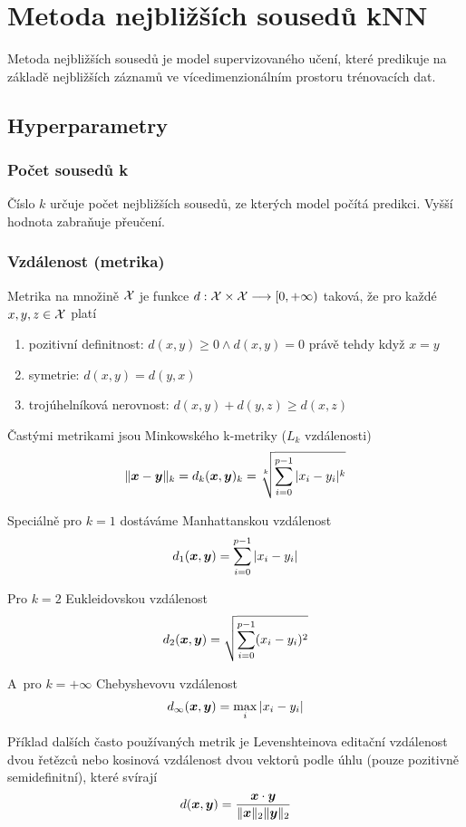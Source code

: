 \section{Metoda nejbližších sousedů kNN}

Metoda nejbližších sousedů je model supervizovaného učení, které predikuje na základě nejbližších záznamů ve vícedimenzionálním prostoru trénovacích dat.

\subsection{Hyperparametry}

\subsubsection{Počet sousedů k}

Číslo $k$ určuje počet nejbližších sousedů, ze kterých model počítá predikci. Vyšší hodnota zabraňuje přeučení.

\subsubsection{Vzdálenost (metrika)} \label{sec:metrika}

Metrika na množině $\mathcal{X}$ je funkce $d: \mathcal{X} \times \mathcal{X} \longrightarrow [0, +\infty)$ taková, že pro každé $x, y, z \in \mathcal{X}$ platí
\begin{enumerate}
    \item pozitivní definitnost: $d(x, y) \ge 0 \land d(x, y) = 0$ právě tehdy když $x = y$
    \item symetrie: $d(x,y) = d(y,x)$
    \item trojúhelníková nerovnost: $d(x, y) + d(y, z) \ge d(x, z)$
\end{enumerate}

Častými metrikami jsou Minkowského k-metriky ($L_k$ vzdálenosti)
\[
    \|\bm{x} - \bm{y}\|_k = d_k(\bm{x}, \bm{y})_k = \sqrt[k]{\sum_{i=0}^{p-1} |x_i - y_i|^k}
\]

Speciálně pro $k=1$ dostáváme Manhattanskou vzdálenost
\[
    d_1(\bm{x}, \bm{y}) = \sum_{i=0}^{p-1} |x_i - y_i|
\]

Pro $k=2$ Eukleidovskou vzdálenost
\[
    d_2(\bm{x}, \bm{y}) = \sqrt{\sum_{i=0}^{p-1} (x_i - y_i)^2}
\]

A~pro $k=+\infty$ Chebyshevovu vzdálenost
\[
    d_{\infty}(\bm{x}, \bm{y}) = \max_i |x_i - y_i|
\]

Příklad dalších často používaných metrik je Levenshteinova editační vzdálenost dvou řetězců nebo kosinová vzdálenost dvou vektorů podle úhlu (pouze pozitivně semidefinitní), které svírají
\[
    d(\bm{x}, \bm{y}) = \frac{\bm{x} \cdot \bm{y}}{\|\bm{x}\|_2 \|\bm{y}\|_2}
\]

